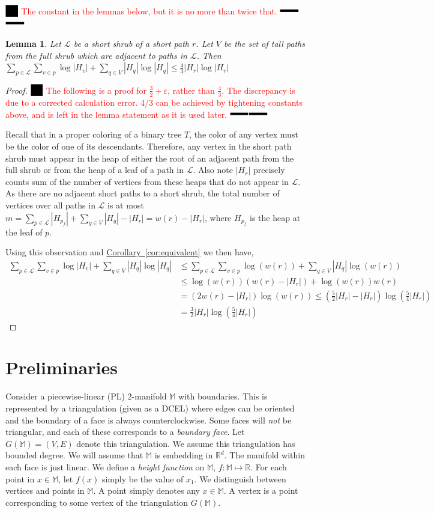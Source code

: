 \documentclass[11pt]{article}
\newtheorem{lemma}[theorem]{Lemma}
\theoremstyle{definition}
\newcommand{\MM}{\mathbb{M}}
\newcommand{\RR}{\mathbb{R}}
\newcommand{\eps}{\varepsilon}
\newcommand{\Cor}[1]{\hyperref[cor:#1]{Corollary~\ref*{cor:#1}}} %
\newcommand{\XSays}[2]{{
      {$\rule[-0.12cm]{0.2in}{0.5cm}$\fbox{\tt
            #1:} }
      \textcolor{red}{#2}
      \marginpar{\textcolor{blue}{#1}}
      {$\rule[0.1cm]{0.3in}{0.1cm}$\fbox{\tt
            end}$\rule[0.1cm]{0.3in}{0.1cm}$}
      }
   }
\newcommand{\Ben}[1]{{\XSays{Ben}{#1}}}
\newcommand{\pth}[2][\!]{#1\left({#2}\right)}
\begin{document}
{\Ben{The constant in the lemmas below, but it is no more than twice that.}

\begin{lemma}
\label{lem:shortCost}
 Let $\mathcal{L}$ be a short shrub of a short path $r$.  Let $V$ be the set of tall paths from the full shrub which are adjacent to paths in $\mathcal{L}$.  
  Then $\sum_{p\in \mathcal{L}}\sum_{v\in p} \log |H_v| + \sum_{q\in V} |H_q|\log |H_q| \leq \frac{4}{3} |H_r|\log |H_r|$
\end{lemma}
\begin{proof}
\Ben{
The following is a proof for $\frac{3}{2}+\eps$, rather than $\frac{4}{3}$.  The discrepancy is due to a corrected calculation error.  
4/3 can be achieved by tightening constants above, and is left in the lemma statement as it is used later.
}

Recall that in a proper coloring of a binary tree $T$, the color of any vertex must be the color of one of its descendants.  
Therefore, any vertex in the short path shrub must appear in the heap of either the root of an adjacent 
path from the full shrub or from the heap of a leaf of a path in $\mathcal{L}$.  
Also note $|H_r|$ precisely counts sum of the number of vertices from these heaps that do not appear in $\mathcal{L}$.
As there are no adjacent short paths to a short shrub, the total number of vertices over all paths in $\mathcal{L}$ is at most 
$m = \sum_{p\in \mathcal{L}} |H_{p_f}| +\sum_{q\in V} |H_q| - |H_r| = w(r)-|H_r|$, where $H_{p_f}$ is the heap at the leaf of $p$. 

Using this observation and \Cor{equivalent} we then have, 
\begin{align*}
 \sum_{p\in \mathcal{L}}\sum_{v\in p} \log |H_v| + \sum_{q\in V} |H_q|\log |H_q|
 &\leq \sum_{p\in \mathcal{L}}\sum_{v\in p} \log(w(r)) + \sum_{q\in V} |H_q|\log(w(r))\\
 &\leq \log(w(r))\pth{ w(r)-|H_r| } + \log(w(r))w(r)\\ 
 &= (2w(r)-|H_r|)\log(w(r)) \leq \pth{\frac{5}{2}|H_r|-|H_r|}\log\pth{\frac{5}{4}|H_r|}\\
 &= \frac{3}{2}|H_r|\log\pth{\frac{5}{4}|H_r|}
\end{align*}
\end{proof}


\section{Preliminaries}
Consider a piecewise-linear (PL) $2$-manifold $\MM$ with boundaries.
This is represented by a triangulation (given as a DCEL) where edges
can be oriented and the boundary of a face is always counterclockwise. Some faces will \emph{not}
be triangular, and each of these corresponds to a \emph{boundary face}.
Let $G(\MM) = (V,E)$ denote this triangulation. We assume this triangulation
has bounded degree.
We will assume that $\MM$ is embedding in $\RR^d$.
The manifold within each face is just linear.
We define a \emph{height function} on $\MM$, $f:\MM \mapsto \RR$. For each point in $x \in \MM$, let $f(x)$ simply be the value of $x_1$.
We distinguish between vertices and points in $\MM$. A point simply denotes any $x \in \MM$. A vertex is a point
corresponding to some vertex of the triangulation $G(\MM)$.

}
\end{document}

